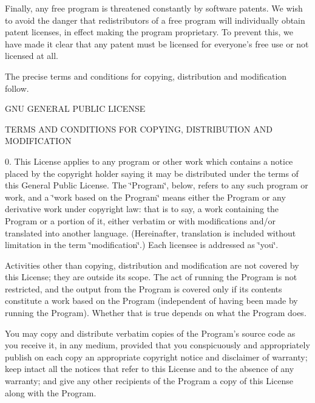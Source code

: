 Finally, any free program is threatened constantly by software patents. We wish to avoid the danger that redistributors of a free program will individually obtain patent licenses, in effect making the program proprietary. To prevent this, we have made it clear that any patent must be licensed for everyone's free use or not licensed at all.

The precise terms and conditions for copying, distribution and modification follow. \begin{DoxyVerb}                GNU GENERAL PUBLIC LICENSE
\end{DoxyVerb}
 T\-E\-R\-M\-S A\-N\-D C\-O\-N\-D\-I\-T\-I\-O\-N\-S F\-O\-R C\-O\-P\-Y\-I\-N\-G, D\-I\-S\-T\-R\-I\-B\-U\-T\-I\-O\-N A\-N\-D M\-O\-D\-I\-F\-I\-C\-A\-T\-I\-O\-N

0. This License applies to any program or other work which contains a notice placed by the copyright holder saying it may be distributed under the terms of this General Public License. The \char`\"{}\-Program\char`\"{}, below, refers to any such program or work, and a \char`\"{}work based on the Program\char`\"{} means either the Program or any derivative work under copyright law\-: that is to say, a work containing the Program or a portion of it, either verbatim or with modifications and/or translated into another language. (Hereinafter, translation is included without limitation in the term \char`\"{}modification\char`\"{}.) Each licensee is addressed as \char`\"{}you\char`\"{}.

Activities other than copying, distribution and modification are not covered by this License; they are outside its scope. The act of running the Program is not restricted, and the output from the Program is covered only if its contents constitute a work based on the Program (independent of having been made by running the Program). Whether that is true depends on what the Program does.


\begin{DoxyEnumerate}
\item You may copy and distribute verbatim copies of the Program's source code as you receive it, in any medium, provided that you conspicuously and appropriately publish on each copy an appropriate copyright notice and disclaimer of warranty; keep intact all the notices that refer to this License and to the absence of any warranty; and give any other recipients of the Program a copy of this License along with the Program.
\end{DoxyEnumerate}

